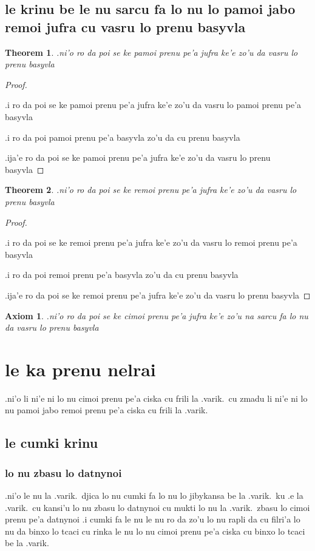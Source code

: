 \documentclass{article}
\newtheorem{thm}{Theorem}
\newtheorem{axiom}{Axiom}
\begin{document}
\subsection{le krinu be le nu sarcu fa lo nu lo pamoi jabo remoi jufra cu vasru lo prenu basyvla}
\begin{thm}
	.ni'o ro da poi se ke pamoi prenu pe'a jufra ke'e zo'u da vasru lo prenu basyvla
\end{thm}
\begin{proof}
	${}$

	.i ro da poi se ke pamoi prenu pe'a jufra ke'e zo'u da vasru lo pamoi prenu pe'a basyvla

	.i ro da poi pamoi prenu pe'a basyvla zo'u da cu prenu basyvla

	.ija'e ro da poi se ke pamoi prenu pe'a jufra ke'e zo'u da vasru lo prenu basyvla
\end{proof}
\begin{thm}
	.ni'o ro da poi se ke remoi prenu pe'a jufra ke'e zo'u da vasru lo prenu basyvla
\end{thm}
\begin{proof}
	${ }$

	.i ro da poi se ke remoi prenu pe'a jufra ke'e zo'u da vasru lo remoi prenu pe'a basyvla

	.i ro da poi remoi prenu pe'a basyvla zo'u da cu prenu basyvla

	.ija'e ro da poi se ke remoi prenu pe'a jufra ke'e zo'u da vasru lo prenu basyvla
\end{proof}
\begin{axiom}
	.ni'o ro da poi se ke cimoi prenu pe'a jufra ke'e zo'u na sarcu fa lo nu da vasru lo prenu basyvla
\end{axiom}

\section{le ka prenu nelrai}
.ni'o li ni'e ni lo nu cimoi prenu pe'a ciska cu frili la .varik.\ cu zmadu li ni'e ni lo nu pamoi jabo remoi prenu pe'a ciska cu frili la .varik.

\subsection{le cumki krinu}

\subsubsection{lo nu zbasu lo datnynoi}
.ni'o le nu la .varik.\ djica lo nu cumki fa lo nu lo jibykansa be la .varik.\ ku .e la .varik.\ cu kansi'u lo nu zbasu lo datnynoi cu mukti lo nu la .varik.\ zbasu lo cimoi prenu pe'a datnynoi  .i cumki fa le nu le nu ro da zo'u lo nu rapli da cu filri'a lo nu da binxo lo tcaci cu rinka le nu lo nu cimoi prenu pe'a ciska cu binxo lo tcaci be la .varik.
\end{document}
